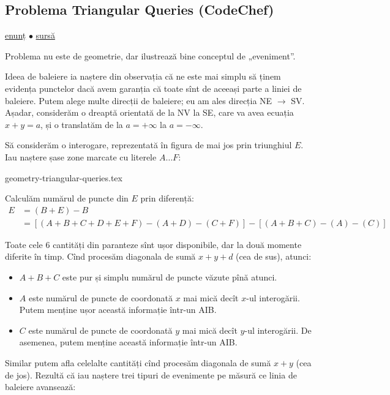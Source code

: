 \documentclass[../main.tex]{subfiles}
\begin{document}
\subsection{Problema Triangular Queries (CodeChef)}
\label{problem:triangular-queries}

\href{https://www.codechef.com/problems/TRIQUERY}{enunț}
$\bullet$
\hyperref[code:triangular-queries]{sursă}

Problema nu este de geometrie, dar ilustrează bine conceptul de „eveniment”.

Ideea de baleiere ia naștere din observația că ne este mai simplu să ținem evidența punctelor dacă avem garanția că toate sînt de aceeași parte a liniei de baleiere. Putem alege multe direcții de baleiere; eu am ales direcția NE $\to$ SV. Așadar, considerăm o dreaptă orientată de la NV la SE, care va avea ecuația $x + y = a$, și o translatăm de la $a = +\infty$ la $a = -\infty$.

Să considerăm o interogare, reprezentată în figura de mai jos prin triunghiul $E$. Iau naștere șase zone marcate cu literele $A \dots F$:

{geometry-triangular-queries.tex}

Calculăm numărul de puncte din $E$ prin diferență:
\begin{align*}
E &= (B + E) - B\\
&= [(A + B + C + D + E + F) - (A + D) - (C + F)] - [(A + B + C) -  (A) - (C)]
\end{align*}

Toate cele 6 cantități din paranteze sînt ușor disponibile, dar la două momente diferite în timp. Cînd procesăm diagonala  de sumă $x + y + d$ (cea de sus), atunci:

\begin{itemize}
  \item $A + B + C$ este pur și simplu numărul de puncte văzute pînă atunci.
  \item $A$ este numărul de puncte de coordonată $x$ mai mică decît $x$-ul interogării. Putem menține ușor această informație într-un AIB.
  \item $C$  este numărul de puncte de coordonată $y$ mai mică decît $y$-ul interogării. De asemenea, putem menține această informație într-un AIB.
\end{itemize}

Similar putem afla celelalte cantități cînd procesăm diagonala de sumă $x + y$ (cea de jos). Rezultă că iau naștere trei tipuri de evenimente pe măsură ce linia de baleiere avansează:
\end{document}
